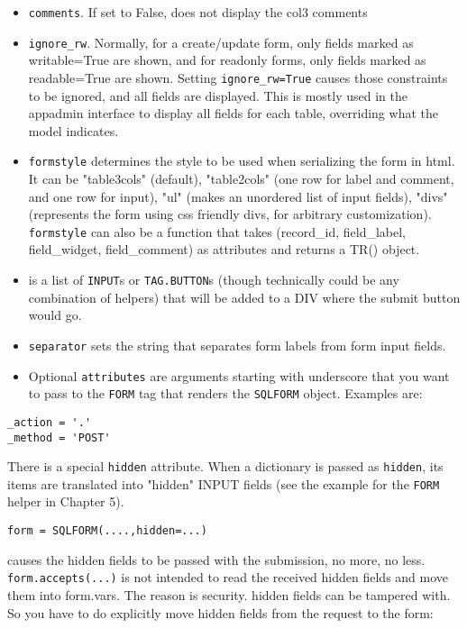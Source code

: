 \documentclass[justified,sixbynine,notoc]{tufte-book}
\def\ft{\small\tt}
\def\inxx#1{\index{#1}}
\begin{document}
\begin{fullwidth}
\begin{itemize}
\item {\ft comments}. If set to False, does not display the col3 comments

\item {\ft ignore\_rw}. Normally, for a create/update form, only fields marked as writable=True are shown, and for readonly forms, only fields marked as readable=True are shown. Setting {\ft ignore\_rw=True} causes those constraints to be ignored, and all fields are displayed. This is mostly used in the appadmin interface to display all fields for each table, overriding what the model indicates.

\item \inxx{formstyle} {\ft formstyle} determines the style to be used when serializing the form in html. It can be "table3cols" (default), "table2cols" (one row for label and comment, and one row for input), "ul" (makes an unordered list of input fields), "divs" (represents the form using css friendly divs, for arbitrary customization). {\ft formstyle} can also be a function that takes (record\_id, field\_label, field\_widget, field\_comment) as attributes and returns a TR() object.

\item \inxx{buttons} is a list of {\ft INPUT}s or {\ft TAG.BUTTON}s (though technically could be any combination of helpers) that will be added to a DIV where the submit button would go.

\item \inxx{separator} {\ft separator} sets the string that separates form labels from form input fields.

\item Optional {\ft attributes} are arguments starting with underscore that you want to pass to the {\ft FORM} tag that renders the {\ft SQLFORM} object. Examples are:
\end{itemize}
\begin{lstlisting}
_action = '.'
_method = 'POST'
\end{lstlisting}

There is a special {\ft hidden} attribute. When a dictionary is passed as {\ft hidden}, its items are translated into "hidden" INPUT fields (see the example for the {\ft FORM} helper in Chapter 5).

\begin{lstlisting}
form = SQLFORM(....,hidden=...)
\end{lstlisting}
causes the hidden fields to be passed  with the submission, no more, no less.
{\ft form.accepts(...)} is not
intended to read the received hidden fields and move them into
form.vars. The reason is security. hidden fields can be tampered with.
So you have to do explicitly move hidden fields from the request to the form:


\end{fullwidth}
\end{document}
